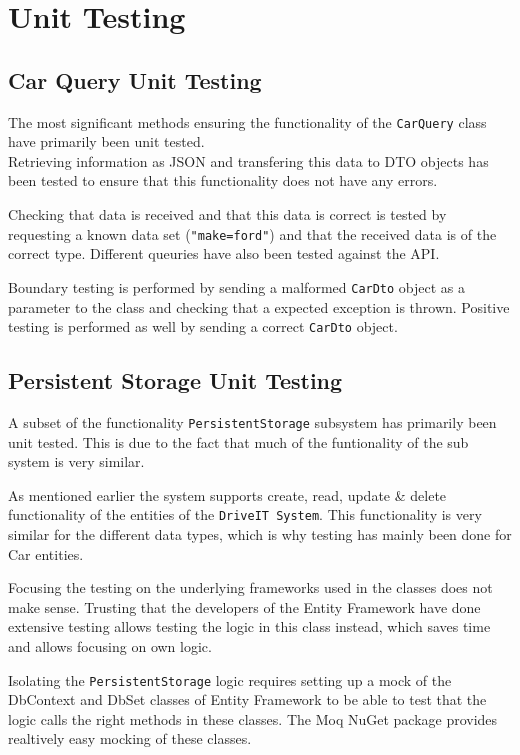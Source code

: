 \section{Unit Testing}
\subsection{Car Query Unit Testing}
The most significant methods ensuring the functionality of the \texttt{CarQuery} class have primarily been unit tested.\\
Retrieving information as JSON and transfering this data to DTO objects has been tested to ensure that this functionality does not have any errors.

Checking that data is received and that this data is correct is tested by requesting a known data set (\texttt{"make=ford"}) and that the received data is of the correct type. Different queuries have also been tested against the API.

Boundary testing is performed by sending a malformed \texttt{CarDto} object as a parameter to the class and checking that a expected exception is thrown. Positive testing is performed as well by sending a correct \texttt{CarDto} object.

\subsection{Persistent Storage Unit Testing}
A subset of the functionality \texttt{PersistentStorage} subsystem has primarily been unit tested. This is due to the fact that much of the funtionality of the sub system is very similar.

As mentioned earlier the system supports create, read, update \& delete functionality of the entities of the \texttt{DriveIT System}. This functionality is very similar for the different data types, which is why testing has mainly been done for Car entities.

Focusing the testing on the underlying frameworks used in the classes does not make sense. Trusting that the developers of the Entity Framework have done extensive testing allows testing the logic in this class instead, which saves time and allows focusing on own logic.

Isolating the \texttt{PersistentStorage} logic requires setting up a mock of the DbContext and DbSet classes of Entity Framework to be able to test that the logic calls the right methods in these classes. The Moq NuGet package provides realtively easy mocking of these classes. 

